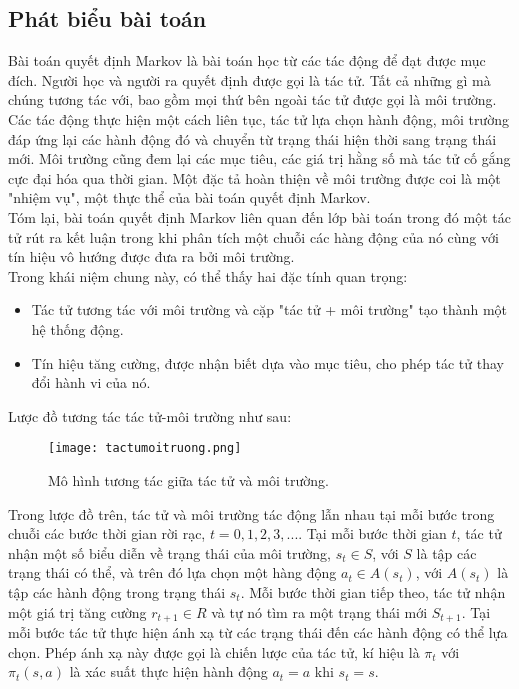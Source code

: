 \subsection{Phát biểu bài toán}
Bài toán quyết định Markov là bài toán học từ các tác động để đạt được mục đích. Người học và người ra quyết định được gọi là tác tử. Tất cả những gì mà chúng tương tác với, bao gồm mọi thứ bên ngoài tác tử được gọi là môi trường. Các tác động thực hiện một cách liên tục, tác tử lựa chọn hành động, môi trường đáp ứng lại các hành động đó và chuyển từ trạng thái hiện thời sang trạng thái mới. Môi trường cũng đem lại các mục tiêu, các giá trị hằng số mà tác tử cố gắng cực đại hóa qua thời gian. Một đặc tả hoàn thiện về môi trường được coi là một "nhiệm vụ", một thực thể của bài toán quyết định Markov.\\
Tóm lại, bài toán quyết định Markov liên quan đến lớp bài toán trong đó một tác tử rút ra kết luận trong khi phân tích một chuỗi các hàng động của nó cùng với tín hiệu vô hướng được đưa ra bởi môi trường.\\
Trong khái niệm chung này, có thể thấy hai đặc tính quan trọng:
\begin{itemize}
\item Tác tử tương tác với môi trường và cặp "tác tử + môi trường" tạo thành một hệ thống động.
\item Tín hiệu tăng cường, được nhận biết dựa vào mục tiêu, cho phép tác tử thay đổi hành vi của nó.
\end{itemize}
Lược đồ tương tác tác tử-môi trường như sau:\\
\newpage
\begin{figure}[ht]
    \centering
    \texttt{[image: tactumoitruong.png]}
    \caption{Mô hình tương tác giữa tác tử và môi trường.}
    \label{fig:tactumoitruong}
\end{figure}

Trong lược đồ trên, tác tử và môi trường tác động lẫn nhau tại mỗi bước trong chuỗi các bước thời gian rời rạc, $t=0,1,2,3,...$. Tại mỗi bước thời gian $t$, tác tử nhận một số biểu diễn về trạng thái của môi trường, $s_t \in S$, với $S$ là tập các trạng thái có thể, và trên đó lựa chọn một hàng động $a_t \in A(s_t)$, với $A(s_t)$ là tập các hành động trong trạng thái $s_t$. Mỗi bước thời gian tiếp theo, tác tử nhận một giá trị tăng cường $r_{t+1}\in R$ và tự nó tìm ra một trạng thái mới $S_{t+1}$.
\newline \medskip
Tại mỗi bước tác tử thực hiện ánh xạ từ các trạng thái đến các hành động có thể lựa chọn. Phép ánh xạ này được gọi là chiến lược của tác tử, kí hiệu là $\pi_t$ với $\pi_t(s,a)$ là xác suất thực hiện hành động $a_t=a$ khi $s_t=s$. 


